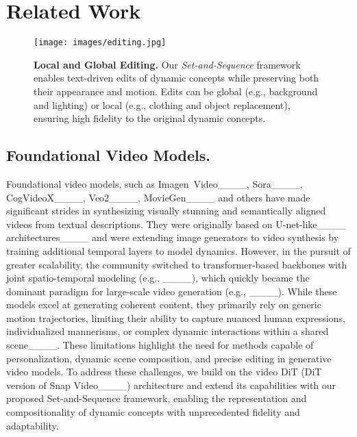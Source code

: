 \section{Related Work}
\begin{figure*}[t!]
        \centering
        
        \texttt{[image: images/editing.jpg]}
        \caption{\textbf{Local and Global Editing.} Our \textit{Set-and-Sequence} framework enables text-driven edits of dynamic concepts while preserving both their appearance and motion. Edits can be global (e.g., background and lighting) or local (e.g., clothing and object replacement), ensuring high fidelity to the original dynamic concepts.}
        \label{fig:editing}
    \end{figure*}




\subsection{Foundational Video Models.}

Foundational video models, such as Imagen~Video____, Sora____, CogVideoX____, Veo2____, MovieGen____ and others have made significant strides in synthesizing visually stunning and semantically aligned videos from textual descriptions. They were originally based on U-net-like____ architectures____ and were extending image generators to video synthesis by training additional temporal layers to model dynamics. However, in the pursuit of greater scalability, the community switched to transformer-based backbones with joint spatio-temporal modeling (e.g., ____), which quickly became the dominant paradigm for large-scale video generation (e.g., ____). While these models excel at generating coherent content, they primarily rely on generic motion trajectories, limiting their ability to capture nuanced human expressions, individualized mannerisms, or complex dynamic interactions within a shared scene____.
These limitations highlight the need for methods capable of personalization, dynamic scene composition, and precise editing in generative video models.
To address these challenges, we build on the video DiT (DiT version of Snap Video____) architecture and extend its capabilities with our proposed Set-and-Sequence framework, enabling the representation and compositionality of dynamic concepts with unprecedented fidelity and adaptability.







